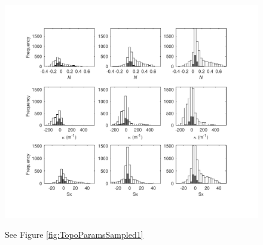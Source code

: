 \documentclass[review,oneside, letterpaper]{igs}
\begin{document}
\begin{figure}
	\centering
	\includegraphics[width =\textwidth]{TopoParamsSampled2.pdf}\\
	\caption{See Figure \ref{fig:TopoParamsSampled1}}
	\label{fig:TopoParamsSampled2}
\end{figure}

\end{document}
